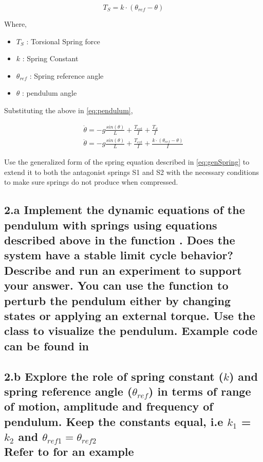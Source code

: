 \documentclass{cmc}
\begin{document}
\begin{equation}
  \label{eqn:spring}
  T_{S} = k \cdot (\theta_{ref} - \theta)
\end{equation}

Where,
\begin{itemize}
\item $T_{S}$ : Torsional Spring force
\item $k$ : Spring Constant
\item $\theta_{ref}$ : Spring reference angle
\item $\theta$ : pendulum angle
\end{itemize}

Substituting the above in \ref{eq:pendulum},

\begin{eqnarray}
  \label{eq:spring}
  \ddot{\theta} = -g\frac{sin(\theta)}{L} + \frac{T_{ext}}{I} + \frac{T_{S}}{I} \\
  \ddot{\theta} = -g\frac{sin(\theta)}{L} + \frac{T_{ext}}{I} + \frac{k \cdot (\theta_{ref} - \theta)}{I} \label{eq:genSpring}
\end{eqnarray}

Use the generalized form of the spring equation described in
\ref{eq:genSpring} to extend it to both the antagonist springs S1 and
S2 with the necessary conditions to make sure springs do not produce
when compressed.



\subsection*{2.a Implement the dynamic equations of the pendulum with
  springs using equations described above in the function
  .  Does the system
  have a stable limit cycle behavior?  Describe and run an experiment
  to support your answer. You can use the function
   to perturb the
  pendulum either by changing states or applying an external torque.
  Use the class  to
  visualize the pendulum. Example code can be found in
  }
\label{subsec:2.a}


\subsection*{2.b Explore the role of spring constant ($k$) and spring
  reference angle ($\theta_{ref}$) in terms of range of motion,
  amplitude and frequency of pendulum. Keep the constants equal, i.e
  $k_1$  = $k_2$ and $\theta_{ref1} = \theta_{ref2}$
  \\ Refer to  for an example}
\end{document}
